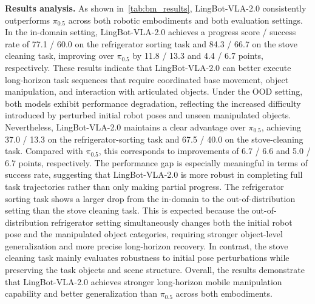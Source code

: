 \noindent\textbf{Results analysis.} As shown in~\cref{tab:bm_results}, LingBot-VLA-2.0 consistently outperforms $\pi_{0.5}$ across both robotic embodiments and both evaluation settings. In the in-domain setting, LingBot-VLA-2.0 achieves a progress score / success rate of 77.1 / 60.0 on the refrigerator sorting task and 84.3 / 66.7 on the stove cleaning task, improving over $\pi_{0.5}$ by 11.8 / 13.3 and 4.4 / 6.7 points, respectively. These results indicate that LingBot-VLA-2.0 can better execute long-horizon task sequences that require coordinated base movement, object manipulation, and interaction with articulated objects.
Under the OOD setting, both models exhibit performance degradation, reflecting the increased difficulty introduced by perturbed initial robot poses and unseen manipulated objects. Nevertheless, LingBot-VLA-2.0 maintains a clear advantage over $\pi_{0.5}$, achieving 37.0 / 13.3 on the refrigerator-sorting task and 67.5 / 40.0 on the stove-cleaning task. Compared with $\pi_{0.5}$, this corresponds to improvements of 6.7 / 6.6 and 5.0 / 6.7 points, respectively. The performance gap is especially meaningful in terms of success rate, suggesting that LingBot-VLA-2.0 is more robust in completing full task trajectories rather than only making partial progress.
The refrigerator sorting task shows a larger drop from the in-domain to the out-of-distribution setting than the stove cleaning task. This is expected because the out-of-distribution refrigerator setting simultaneously changes both the initial robot pose and the manipulated object categories, requiring stronger object-level generalization and more precise long-horizon recovery. In contrast, the stove cleaning task mainly evaluates robustness to initial pose perturbations while preserving the task objects and scene structure. Overall, the results demonstrate that LingBot-VLA-2.0 achieves stronger long-horizon mobile manipulation capability and better generalization than $\pi_{0.5}$ across both embodiments.





